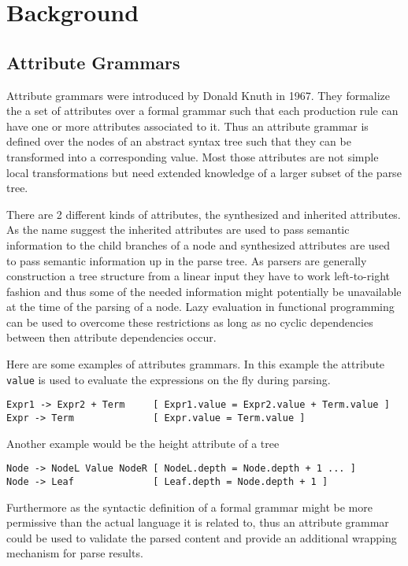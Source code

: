 \section{Background}
\subsection{Attribute Grammars}
Attribute grammars were introduced by Donald Knuth in 1967. They formalize the a set of attributes over a formal grammar such that each production rule can have one or more attributes associated to it. Thus an attribute grammar is defined over the nodes of an abstract syntax tree such that they can be transformed into a corresponding value. Most those attributes are not simple local transformations but need extended knowledge of a larger subset of the parse tree.

There are 2 different kinds of attributes, the synthesized and inherited attributes. As the name suggest the inherited attributes are used to pass semantic information to the child branches of a node and synthesized attributes are used to pass semantic information up in the parse tree. As parsers are generally construction a tree structure from a linear input they have to work left-to-right fashion and thus some of the needed information might potentially be unavailable at the time of the parsing of a node. Lazy evaluation in functional programming can be used to overcome these restrictions as long as no cyclic dependencies between then attribute dependencies occur.

Here are some examples of attributes grammars.
In this example the attribute \verb/value/ is used to evaluate the expressions on the fly during parsing.
\begin{verbatim}
Expr1 -> Expr2 + Term     [ Expr1.value = Expr2.value + Term.value ]
Expr -> Term              [ Expr.value = Term.value ]
\end{verbatim}
Another example would be the height attribute of a tree
\begin{verbatim}
Node -> NodeL Value NodeR [ NodeL.depth = Node.depth + 1 ... ] 
Node -> Leaf              [ Leaf.depth = Node.depth + 1 ]
\end{verbatim}

Furthermore as the syntactic definition of a formal grammar might be more permissive than the actual language it is related to, thus an attribute grammar could be used to validate the parsed content and provide an additional wrapping mechanism for parse results. 

